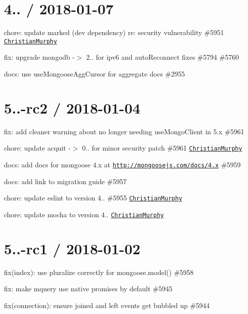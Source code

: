 \section*{4.. / 2018-\/01-\/07 }


\begin{DoxyItemize}
\item chore\+: update marked (dev dependency) re\+: security vulnerability \#5951 \href{https://github.com/ChristianMurphy}{\tt Christian\+Murphy}
\item fix\+: upgrade mongodb -\/$>$ 2.. for ipv6 and auto\+Reconnect fixes \#5794 \#5760
\item docs\+: use use\+Mongoose\+Agg\+Cursor for aggregate docs \#2955
\end{DoxyItemize}

\section*{5..-\/rc2 / 2018-\/01-\/04 }


\begin{DoxyItemize}
\item fix\+: add cleaner warning about no longer needing {\ttfamily use\+Mongo\+Client} in 5.\+x \#5961
\item chore\+: update acquit -\/$>$ 0.. for minor security patch \#5961 \href{https://github.com/ChristianMurphy}{\tt Christian\+Murphy}
\item docs\+: add docs for mongoose 4.\+x at \href{http://mongoosejs.com/docs/4.x}{\tt http\+://mongoosejs.\+com/docs/4.\+x} \#5959
\item docs\+: add link to migration guide \#5957
\item chore\+: update eslint to version 4.. \#5955 \href{https://github.com/ChristianMurphy}{\tt Christian\+Murphy}
\item chore\+: update mocha to version 4.. \href{https://github.com/ChristianMurphy}{\tt Christian\+Murphy}
\end{DoxyItemize}

\section*{5..-\/rc1 / 2018-\/01-\/02 }


\begin{DoxyItemize}
\item fix(index)\+: use pluralize correctly for {\ttfamily mongoose.\+model()} \#5958
\item fix\+: make mquery use native promises by default \#5945
\item fix(connection)\+: ensure \textquotesingle{}joined\textquotesingle{} and \textquotesingle{}left\textquotesingle{} events get bubbled up \#5944
\end{DoxyItemize}

